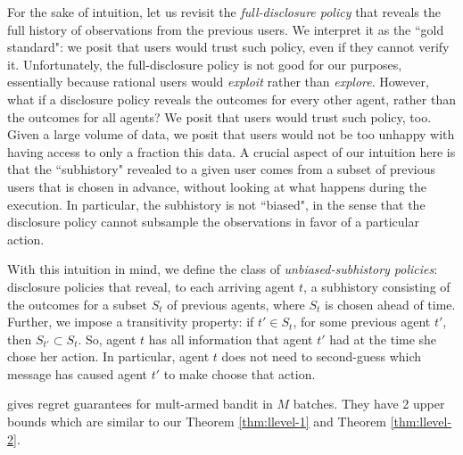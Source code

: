 For the sake of intuition, let us revisit the \emph{full-disclosure policy} that reveals the full history of observations from the previous users. We interpret it as the ``gold standard": we posit that users would trust such policy, even if they cannot verify it. Unfortunately, the full-disclosure policy is not good for our purposes, essentially because rational users would \emph{exploit} rather than \emph{explore}. However, what if a disclosure policy reveals the outcomes for every other agent, rather than the outcomes for all agents? We posit that users would trust such policy, too. Given a large volume of data, we posit that users would not be too unhappy with having access to only a fraction this data. A crucial aspect of our intuition here is that the ``subhistory" revealed to a given user comes from a subset of previous users that is chosen in advance, without looking at what happens during the execution. In particular, the subhistory is not ``biased", in the sense that the disclosure policy cannot subsample the observations in favor of a particular action.

With this intuition in mind, we define the class of \emph{unbiased-subhistory policies}: disclosure policies that reveal, to each arriving agent $t$, a subhistory  consisting of the outcomes for a subset $S_t$ of previous agents, where $S_t$ is chosen ahead of time. Further, we impose a transitivity property: if $t' \in S_t$, for some previous agent $t'$, then $S_{t'}\subset S_t$. So, agent $t$ has all information that agent $t'$ had at the time she chose her action. In particular, agent $t$ does not need to second-guess which message has caused agent $t'$ to make choose that action.













\cite{Perchet2015BatchedBP} gives regret guarantees for mult-armed bandit in $M$ batches. They have 2 upper bounds which are similar to our Theorem \ref{thm:llevel-1} and Theorem \ref{thm:llevel-2}.
